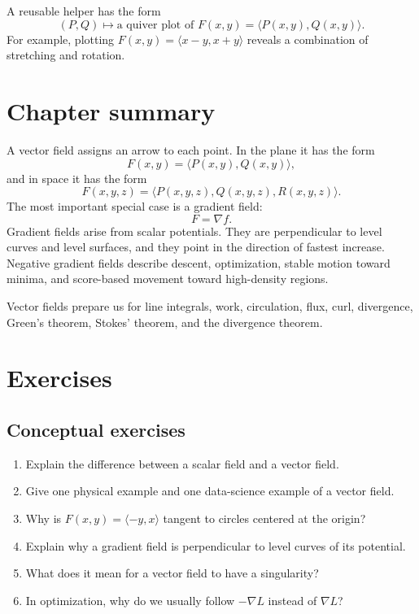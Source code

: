 \documentclass[11pt]{article}
\newcommand{\grad}{\nabla}
\begin{document}
A reusable helper has the form
\[
(P,Q)\mapsto \text{a quiver plot of }F(x,y)=\langle P(x,y),Q(x,y)\rangle.
\]
For example, plotting $F(x,y)=\langle x-y,x+y\rangle$ reveals a combination of stretching and rotation.

\section{Chapter summary}

A vector field assigns an arrow to each point. In the plane it has the form
\[
F(x,y)=\langle P(x,y),Q(x,y)\rangle,
\]
and in space it has the form
\[
F(x,y,z)=\langle P(x,y,z),Q(x,y,z),R(x,y,z)\rangle.
\]
The most important special case is a gradient field:
\[
F=\grad f.
\]
Gradient fields arise from scalar potentials. They are perpendicular to level curves and level surfaces, and they point in the direction of fastest increase. Negative gradient fields describe descent, optimization, stable motion toward minima, and score-based movement toward high-density regions.

Vector fields prepare us for line integrals, work, circulation, flux, curl, divergence, Green's theorem, Stokes' theorem, and the divergence theorem.

\section{Exercises}

\subsection*{Conceptual exercises}
\begin{enumerate}
  \item Explain the difference between a scalar field and a vector field.
  \item Give one physical example and one data-science example of a vector field.
  \item Why is $F(x,y)=\langle -y,x\rangle$ tangent to circles centered at the origin?
  \item Explain why a gradient field is perpendicular to level curves of its potential.
  \item What does it mean for a vector field to have a singularity?
  \item In optimization, why do we usually follow $-\grad L$ instead of $\grad L$?
\end{enumerate}
\end{document}
